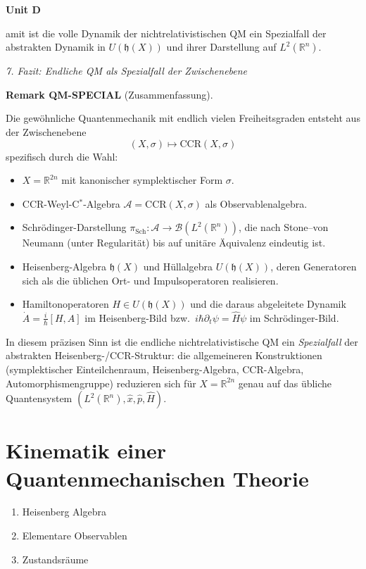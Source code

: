 \documentclass[10pt, letterpaper]{article}
\newcommand{\CustomHeading}[3]{%
  \par\medskip\noindent%
  \textbf{#1 #2} \textnormal{(#3)}.\enskip%
}
\newenvironment{REM}[2]{\begin{unitbox}\CustomHeading{Remark}{#1}{#2}}{\end{unitbox}}
\newenvironment{unit}[1]
  {\begin{unitbox}\textbf{Unit #1}\par\smallskip}
  {\end{unitbox}}
\begin{document}
\begin{unit}
Damit ist die volle Dynamik der nichtrelativistischen QM
ein Spezialfall der abstrakten Dynamik in \(U(\mathfrak{h}(X))\)
und ihrer Darstellung auf \(L^2(\mathbb{R}^n)\).

\emph{7. Fazit: Endliche QM als Spezialfall der Zwischenebene}

\begin{REM}{QM-SPECIAL}{Zusammenfassung}
Die gewöhnliche Quantenmechanik mit endlich vielen Freiheitsgraden
entsteht aus der Zwischenebene
\[
(X,\sigma)\longmapsto \mathrm{CCR}(X,\sigma)
\]
spezifisch durch die Wahl:
\begin{itemize}
  \item \(X = \mathbb{R}^{2n}\) mit kanonischer symplektischer Form \(\sigma\).
  \item CCR-Weyl-C$^\ast$-Algebra \(\mathcal{A} = \mathrm{CCR}(X,\sigma)\) als Observablenalgebra.
  \item Schrödinger-Darstellung \(\pi_{\mathrm{Sch}}:\mathcal{A}\to\mathcal{B}(L^2(\mathbb{R}^n))\),
        die nach Stone--von Neumann (unter Regularität) bis auf unitäre Äquivalenz eindeutig ist.
  \item Heisenberg-Algebra \(\mathfrak{h}(X)\) und Hüllalgebra \(U(\mathfrak{h}(X))\),
        deren Generatoren sich als die üblichen Ort- und Impulsoperatoren
        realisieren.
  \item Hamiltonoperatoren \(H \in U(\mathfrak{h}(X))\) und die daraus
        abgeleitete Dynamik \(\dot{A}=\frac{i}{\hbar}[H,A]\) im Heisenberg-Bild
        bzw.\ \(i\hbar\partial_t\psi=\hat{H}\psi\) im Schrödinger-Bild.
\end{itemize}

In diesem präzisen Sinn ist die endliche nichtrelativistische QM
ein \emph{Spezialfall} der abstrakten Heisenberg-/CCR-Struktur:
die allgemeineren Konstruktionen (symplektischer Einteilchenraum,
Heisenberg-Algebra, CCR-Algebra, Automorphismengruppe)
reduzieren sich für \(X=\mathbb{R}^{2n}\) genau auf das übliche
Quantensystem \((L^2(\mathbb{R}^n),\hat{x},\hat{p},\hat{H})\).
\end{REM}


\end{unit}


\section{Kinematik einer Quantenmechanischen Theorie}


\begin{enumerate}
  \item Heisenberg Algebra
  \item Elementare Observablen
  \item Zustandsräume
\end{enumerate}
\end{document}
